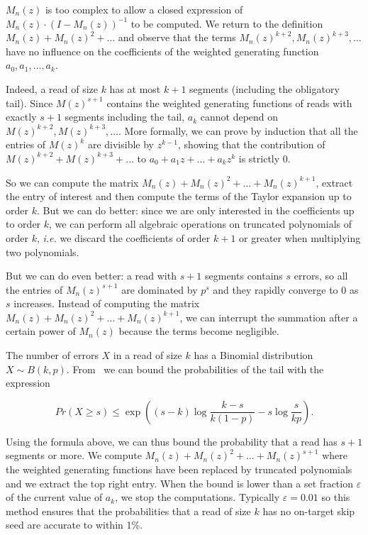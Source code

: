 \documentclass{article}
\begin{document}
$M_n(z)$ is too complex to allow a closed expression of $M_n(z) \cdot
(I-M_n(z))^{-1}$ to be computed. We return to the definition $M_n(z) +
M_n(z)^2 + \ldots$ and observe that the terms $M_n(z)^{k+2}, M_n(z)^{k+3},
\ldots$ have no influence on the coefficients of the weighted generating
function $a_0, a_1, \ldots, a_k$.

Indeed, a read of size $k$ has at most $k+1$ segments (including the
obligatory tail). Since $M(z)^{s+1}$ contains the weighted generating
functions of reads with exactly $s+1$ segments including the tail, $a_k$
cannot depend on $M(z)^{k+2}, M(z)^{k+3}, \ldots$. More formally, we can
prove by induction that all the entries of $M(z)^k$ are divisible by
$z^{k-1}$, showing that the contribution of $M(z)^{k+2} + M(z)^{k+3} +
\ldots$ to $a_0 + a_1z + \ldots +a_kz^k$ is strictly $0$.

So we can compute the matrix $M_n(z) + M_n(z)^2 + \ldots + M_n(z)^{k+1}$,
extract the entry of interest and then compute the terms of the Taylor
expansion up to order $k$. But we can do better: since we are only
interested in the coefficients up to order $k$, we can perform all
algebraic operations on truncated polynomials of order $k$, \textit{i.e.}
we discard the coefficients of order $k+1$ or greater when multiplying two
polynomials.

But we can do even better: a read with $s+1$ segments contains $s$ errors,
so all the entries of $M_n(z)^{s+1}$ are dominated by $p^s$ and they
rapidly converge to $0$ as $s$ increases. Instead of computing the matrix
$M_n(z) + M_n(z)^2 + \ldots + M_n(z)^{k+1}$, we can interrupt the
summation after a certain power of $M_n(z)$ because the terms become
negligible.

The number of errors $X$ in a read of size $k$ has a Binomial
distribution $X \sim B(k,p)$. From~\cite{arratia1989tutorial} we can bound
the probabilities of the tail with the expression

\begin{equation}
\label{eq:bound}
Pr(X \geq s) \leq \exp \left( (s-k)\log \frac{k-s}{k(1-p)} -s\log
\frac{s}{kp} \right).
\end{equation}

Using the formula above, we can thus bound the probability that a read has
$s+1$ segments or more. We compute $M_n(z) + M_n(z)^2 + \ldots
+M_n(z)^{s+1}$ where the weighted generating functions have been replaced
by truncated polynomials and we extract the top right entry. When the
bound is lower than a set fraction $\varepsilon$ of the current value of
$a_k$, we stop the computations. Typically $\varepsilon = 0.01$ so this
method ensures that the probabilities that a read of size $k$ has no
on-target skip seed are accurate to within 1\%.
\end{document}
